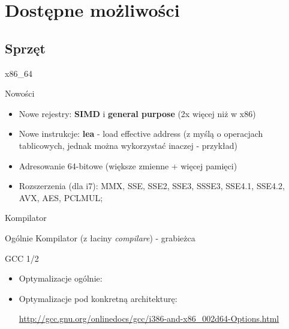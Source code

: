 \section{Dostępne możliwości} %
\subsection{Sprzęt}
\begin{frame}[fragile]{x86\_64}
	\begin{block}{Nowości}
		\begin{itemize}
			\item Nowe rejestry: \textbf{SIMD} i \textbf{general purpose} (2x więcej niż w x86)
			\item Nowe instrukcje: \textbf{lea} - load effective address (z myślą o operacjach
			tablicowych, jednak można wykorzystać inaczej - przykład)
			\item Adresowanie 64-bitowe (większe zmienne + więcej pamięci)
			\item Rozszerzenia (dla i7): MMX, SSE, SSE2, SSE3, SSSE3, SSE4.1, SSE4.2, AVX, AES, PCLMUL;
		\end{itemize}
	\end{block}
\end{frame}
\begin{frame}[fragile]{Kompilator}
	\begin{block}{Ogólnie}
	 Kompilator (z łaciny \textit{compilare}) - grabieżca %
	\end{block}
	\begin{block}{GCC 1/2}
 		\begin{itemize}
			\item Optymalizacje ogólnie:
			\begin{itemize}
			 \item \verb*%-p[g]% //profilowanie
			 \item \verb*%-g[gdb],-Og% //debugowanie
			 \item \verb*%-O{0,1,2,3}%
			 \item \verb*%-ffast-math%
			\end{itemize}
 			\item Optymalizacje pod konkretną architekturę:
 			 \begin{itemize}
				\item \verb*%-m%
				\item \verb*%-mtune%
				\item \verb*%-march%
				\item \verb*%-mfpmath% (przykład)
 			 \end{itemize}
 			 \url{http://gcc.gnu.org/onlinedocs/gcc/i386-and-x86_002d64-Options.html}
 		\end{itemize}		
 	\end{block}
\end{frame}
